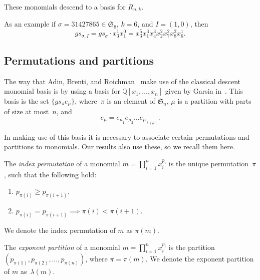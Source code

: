 \documentclass[ALCO,ThmDefs,Unicode,epreuves]{cedram}
\begin{document}
These monomials descend to a basis for $R_{n,k}$.


As an example if $\sigma=31427865\in \mathfrak{S}_8$, $k=6$, and $I=(1,0)$, then
\begin{equation}
gs_{\sigma, I}=gs_\sigma\cdot 
x_3^1x_1^0=x_3^5x_1^3x_4^3x_2^2x_7^2x_8^2x_6^1.
\end{equation}

\subsection{Permutations and partitions}

The way that Adin, Brenti, and Roichman~\cite{ABR} make use of the classical descent monomial basis is by using a basis for 
$\mathbb{Q}[x_1,\ldots, x_n]$ given by Garsia in~\cite{G}. This basis is the set $\{gs_\pi e_\mu\}$, where~$\pi$ is an 
element of $\mathfrak{S}_n$, $\mu$ is a partition with parts of size at most~$n$, and
		\begin{equation}
e_\mu=e_{\mu_1}e_{\mu_2}\ldots e_{\mu_{\ell(\mu)}}.
\end{equation}

	 In making use of this basis it is necessary to associate certain permutations and partitions to monomials. Our results 
also use these, so we recall them here. 

\begin{defi}

The \emph{index permutation} of a monomial $m=\prod_{i=1}^n x_i^{p_i}$ is the unique permutation~$\pi$, such that the 
following hold:

	\begin{enumerate}

		\item $p_{\pi(i)}\geq p_{\pi(i+1)}$,

		\item $p_{\pi(i)}=p_{\pi(i+1)}\implies \pi(i)<\pi(i+1)$.


	\end{enumerate}

We denote the index permutation of $m$ as $\pi(m)$.

\end{defi}

\begin{defi}

	The \emph{exponent partition} of a monomial $m=\prod_{i=1}^n x_i^{p_i}$ is the partition $(p_{\pi(1)},p_{\pi(2)},\ldots, 
p_{\pi(n)})$, where $\pi=\pi(m)$. We denote the exponent partition of $m$ as~$\lambda(m)$.


\end{defi}
\end{document}
